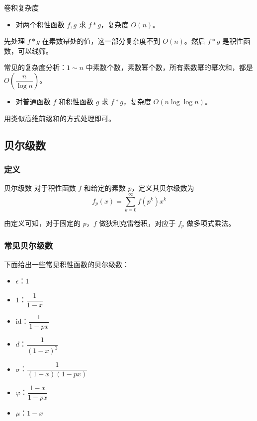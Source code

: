 \documentclass[../main.tex]{subfiles}
\begin{document}
\begin{frame}{卷积复杂度}
\begin{itemize}
\item 对两个积性函数 $f,g$ 求 $f*g$，复杂度 $O(n)$。
\end{itemize}\pause

先处理 $f*g$ 在素数幂处的值，这一部分复杂度不到 $O(n)$。然后 $f*g$ 是积性函数，可以线筛。\pause

常见的复杂度分析：$1\sim n$ 中素数个数，素数幂个数，所有素数幂的幂次和，都是 $O(\dfrac{n}{\log n})$。\pause

\begin{itemize}
\item 对普通函数 $f$ 和积性函数 $g$ 求 $f*g$，复杂度 $O(n\log\log n)$。
\end{itemize}\pause

用类似高维前缀和的方式处理即可。
\end{frame}

\subsection{贝尔级数}

\subsubsection{定义}

\begin{frame}{贝尔级数}
对于积性函数 $f$ 和给定的素数 $p$，定义其贝尔级数为
$$
f_p(x)=\sum_{k=0}^{\infty} f(p^k)x^k
$$\pause

由定义可知，对于固定的 $p$，$f$ 做狄利克雷卷积，对应于 $f_p$ 做多项式乘法。
\end{frame}

\subsubsection{常见贝尔级数}

\begin{frame}
下面给出一些常见积性函数的贝尔级数：

\begin{itemize}
\item $\epsilon$：$1$\pause
\item $1$：$\dfrac{1}{1-x}$\pause
\item $\text{id}$：$\dfrac{1}{1-px}$\pause
\item $d$：$\dfrac{1}{(1-x)^2}$\pause
\item $\sigma$：$\dfrac{1}{(1-x)(1-px)}$\pause
\item $\varphi$：$\dfrac{1-x}{1-px}$\pause
\item $\mu$：$1-x$
\end{itemize}
\end{frame}
\end{document}
